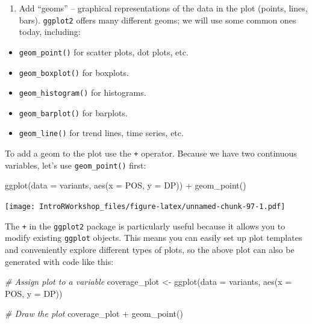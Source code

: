 \documentclass[
]{book}
\newenvironment{Shaded}{\begin{snugshade}}{\end{snugshade}}
\newcommand{\AttributeTok}[1]{\textcolor[rgb]{0.77,0.63,0.00}{#1}}
\newcommand{\CommentTok}[1]{\textcolor[rgb]{0.56,0.35,0.01}{\textit{#1}}}
\newcommand{\FunctionTok}[1]{\textcolor[rgb]{0.00,0.00,0.00}{#1}}
\newcommand{\NormalTok}[1]{#1}
\newcommand{\OtherTok}[1]{\textcolor[rgb]{0.56,0.35,0.01}{#1}}
\newcommand{\SpecialCharTok}[1]{\textcolor[rgb]{0.00,0.00,0.00}{#1}}
\providecommand{\tightlist}{%
  \setlength{\itemsep}{0pt}\setlength{\parskip}{0pt}}
\begin{document}
\begin{enumerate}
\def\labelenumi{\arabic{enumi}.}
\setcounter{enumi}{2}
\tightlist
\item
  Add ``geoms'' -- graphical representations of the data in the plot (points, lines, bars). \texttt{ggplot2} offers many different geoms; we will use some common ones today, including:
\end{enumerate}

\begin{itemize}
\tightlist
\item
  \texttt{geom\_point()} for scatter plots, dot plots, etc.
\item
  \texttt{geom\_boxplot()} for boxplots.
\item
  \texttt{geom\_histogram()} for histograms.
\item
  \texttt{geom\_barplot()} for barplots.
\item
  \texttt{geom\_line()} for trend lines, time series, etc.
\end{itemize}

To add a geom to the plot use the \texttt{+} operator. Because we have two continuous variables, let's use \texttt{geom\_point()} first:

\begin{Shaded}
\begin{Highlighting}[]
\FunctionTok{ggplot}\NormalTok{(}\AttributeTok{data =}\NormalTok{ variants, }\FunctionTok{aes}\NormalTok{(}\AttributeTok{x =}\NormalTok{ POS, }\AttributeTok{y =}\NormalTok{ DP)) }\SpecialCharTok{+}
  \FunctionTok{geom\_point}\NormalTok{()}
\end{Highlighting}
\end{Shaded}

\texttt{[image: IntroRWorkshop\_files/figure-latex/unnamed-chunk-97-1.pdf]}

The \texttt{+} in the \texttt{ggplot2} package is particularly useful because it allows you to modify existing \texttt{ggplot} objects. This means you can easily set up plot templates and conveniently explore different types of plots, so the above plot can also be generated with code like this:

\begin{Shaded}
\begin{Highlighting}[]
\CommentTok{\# Assign plot to a variable}
\NormalTok{coverage\_plot }\OtherTok{\textless{}{-}} \FunctionTok{ggplot}\NormalTok{(}\AttributeTok{data =}\NormalTok{ variants, }\FunctionTok{aes}\NormalTok{(}\AttributeTok{x =}\NormalTok{ POS, }\AttributeTok{y =}\NormalTok{ DP))}

\CommentTok{\# Draw the plot}
\NormalTok{coverage\_plot }\SpecialCharTok{+}
    \FunctionTok{geom\_point}\NormalTok{()}
\end{Highlighting}
\end{Shaded}
\end{document}

